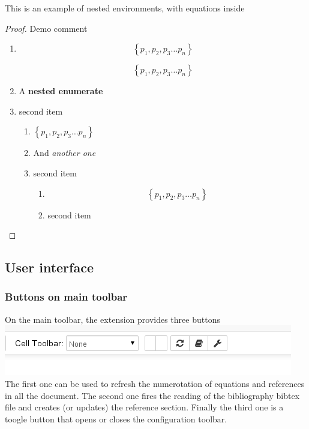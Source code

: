     This is an example of nested environments, with equations inside\\
\begin{proof} Demo %
comment
\begin{enumerate} \item

\begin{equation}\label{eq:}
\left\{ p_1, p_2, p_3 \ldots p_n \right\}
\end{equation}

\[ \left\{ p_1, p_2, p_3 \ldots p_n \right\} \] \item A \textbf{nested
enumerate} \item second item \begin{enumerate} \item
\(\left\{ p_1, p_2, p_3 \ldots p_n \right\}\) \item And \emph{another
one} \item second item \begin{enumerate} \item
\[ \left\{ p_1, p_2, p_3 \ldots p_n \right\} \] \item second item
\end{enumerate} \end{enumerate} \end{enumerate}
\end{proof}

    \subsection{User interface}\label{user-interface}

    \subsubsection{Buttons on main toolbar}\label{buttons-on-main-toolbar}

    On the main toolbar, the extension provides three buttons
\includegraphics{main_toolbar.png} The first one can be used to refresh
the numerotation of equations and references in all the document. The
second one fires the reading of the bibliography bibtex file and creates
(or updates) the reference section. Finally the third one is a toogle
button that opens or closes the configuration toolbar.


